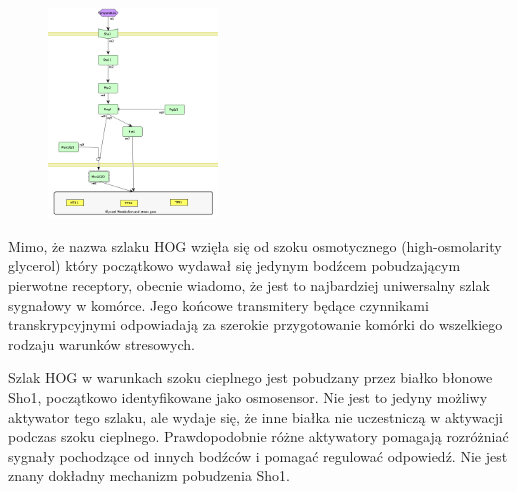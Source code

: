 \documentclass{pracamgr}
\begin{document}
\begin{figure}
\centering
\includegraphics[width=0.4\textwidth]{Obrazy/HOG.png}

\caption{}

\label{fig:myfig}
\end{figure}

Mimo, że nazwa szlaku HOG wzięła się od szoku osmotycznego (high-osmolarity glycerol) który początkowo
wydawał się jedynym bodźcem pobudzającym pierwotne receptory, obecnie wiadomo, że jest to najbardziej
uniwersalny szlak sygnałowy w komórce. Jego końcowe transmitery będące czynnikami transkrypcyjnymi odpowiadają
za szerokie przygotowanie komórki do wszelkiego rodzaju warunków stresowych.

Szlak HOG w warunkach szoku cieplnego jest pobudzany przez białko błonowe Sho1, początkowo identyfikowane 
jako osmosensor. Nie jest to jedyny możliwy aktywator tego szlaku, ale wydaje się, że inne białka 
nie uczestniczą w aktywacji podczas szoku cieplnego. Prawdopodobnie różne aktywatory pomagają rozróżniać
sygnały pochodzące od innych bodźców i pomagać regulować odpowiedź. Nie jest znany dokładny mechanizm
pobudzenia Sho1.




% 
\end{document}
